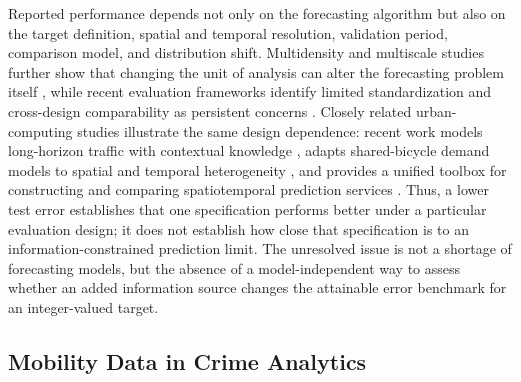 Reported performance depends not only on the forecasting
algorithm but also on the target definition, spatial and temporal resolution,
validation period, comparison model, and distribution shift. Multidensity and
multiscale studies further show that changing the unit of analysis can alter
the forecasting problem itself \citep{cesario2024multidensity,jing2024multiscale},
while recent evaluation frameworks identify limited standardization and
cross-design comparability as persistent concerns \citep{amarante2025steval}.
Closely related urban-computing studies illustrate the same design dependence:
recent work models long-horizon traffic with contextual knowledge
\citep{huo2025traffic}, adapts shared-bicycle demand models to spatial and
temporal heterogeneity \citep{zhao2025bike}, and provides a unified toolbox
for constructing and comparing spatiotemporal prediction services
\citep{fang2025uctb}.
Thus, a lower test error establishes that one specification performs
better under a particular evaluation design; it does not establish how close
that specification is to an information-constrained prediction limit.
The unresolved issue is not a shortage of forecasting models, but the absence
of a model-independent way to assess whether an added information source
changes the attainable error benchmark for an integer-valued target.

\subsection{Mobility Data in Crime Analytics}
\label{subsec:related_mobility_crime}

